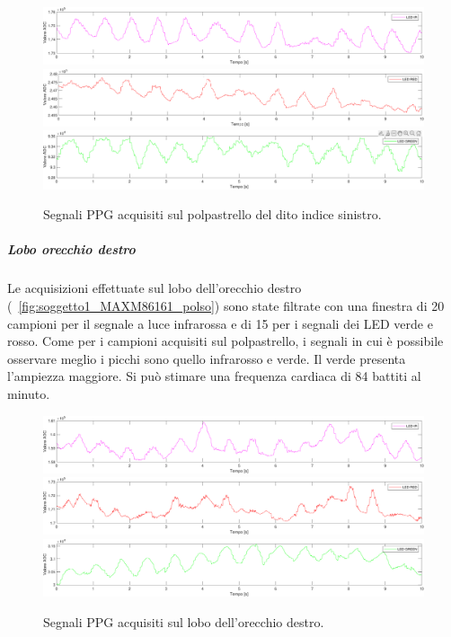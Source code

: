\begin{figure}[h]
	\centering
	\includegraphics[width=1\linewidth]{ImageFiles/Misure Preliminari/Soggetto 1/MAXM86161/polpastrello_ired}
	\includegraphics[width=1\linewidth]{ImageFiles/Misure Preliminari/Soggetto 1/MAXM86161/polpastrello_red}
	\includegraphics[width=1\linewidth]{ImageFiles/Misure Preliminari/Soggetto 1/MAXM86161/polpastrello_green}
	\caption{Segnali PPG acquisiti sul polpastrello del dito indice sinistro.}
	\label{fig:soggetto1_MAXM86161_polpastrello}
\end{figure}

\clearpage

\subparagraph{Lobo orecchio destro}

Le acquisizioni effettuate sul lobo dell'orecchio destro (\Fig~\ref{fig:soggetto1_MAXM86161_polso}) sono state filtrate con una finestra di 20 campioni per il segnale a luce infrarossa e di 15 per i segnali dei LED verde e rosso. Come per i campioni acquisiti sul polpastrello, i segnali in cui è possibile osservare meglio i picchi sono quello infrarosso e verde. Il verde presenta l'ampiezza maggiore. Si può stimare una frequenza cardiaca di 84 battiti al minuto.

\begin{figure}[h]
	\centering
	\includegraphics[width=1\linewidth]{ImageFiles/Misure Preliminari/Soggetto 1/MAXM86161/lobo_ired}
	\includegraphics[width=1\linewidth]{ImageFiles/Misure Preliminari/Soggetto 1/MAXM86161/lobo_red}
	\includegraphics[width=1\linewidth]{ImageFiles/Misure Preliminari/Soggetto 1/MAXM86161/lobo_green}
	\caption{Segnali PPG acquisiti sul lobo dell'orecchio destro.}
	\label{fig:soggetto1_MAXM86161_lobo}
\end{figure}

